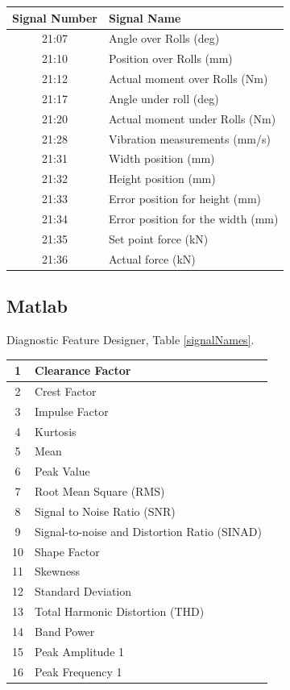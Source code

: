 \documentclass{article}
\begin{document}
\begin{center}
\begin{tabular}{ |c|l| }
 \hline
 Signal Number & Signal Name \\ 
 \hline
21:07 & Angle over Rolls (deg) \\
 \hline
21:10 & Position over Rolls (mm) \\
 \hline
21:12 & Actual moment over Rolls (Nm) \\
 \hline
21:17 & Angle under roll (deg) \\
 \hline
21:20 & Actual moment under Rolls (Nm) \\
 \hline
21:28 & Vibration measurements (mm/s) \\ 
 \hline              
21:31 & Width position (mm) \\
 \hline
21:32 & Height position (mm) \\
 \hline
21:33 & Error position for height (mm) \\
 \hline
21:34 & Error position for the width (mm) \\
 \hline
21:35 & Set point force (kN) \\
 \hline
21:36 & Actual force (kN) \\
 \hline
\end{tabular}
\label{signalNames}
\end{center}
\subsection{Matlab}
Diagnostic Feature Designer, Table \ref{signalNames}.
\begin{center}
\begin{tabular}{ |c|l| }
 \hline
 1 & Clearance Factor \\
 \hline
 2 & Crest Factor \\
 \hline
 3 & Impulse Factor \\
 \hline
 4 & Kurtosis \\
 \hline
 5 & Mean \\
 \hline
 6 & Peak Value \\
 \hline
 7 & Root Mean Square (RMS) \\ 
 \hline              
 8 & Signal to Noise Ratio (SNR) \\
 \hline
 9 & Signal-to-noise and Distortion Ratio (SINAD) \\
 \hline
 10 & Shape Factor \\
 \hline
 11 & Skewness \\
 \hline
 12 & Standard Deviation \\
 \hline
 13 & Total Harmonic Distortion (THD) \\
 \hline
 14 & Band Power \\
 \hline
 15 & Peak Amplitude 1 \\
 \hline
 16 & Peak Frequency 1 \\
 \hline
\end{tabular}
\label{featureNames}
\end{center}
\end{document}
